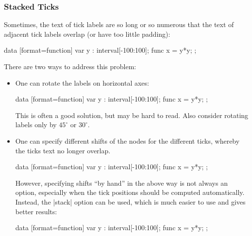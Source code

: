 \subsubsection{Stacked Ticks}
\label{section-dv-stacking}

Sometimes, the text of tick labels are so long or so numerous that the text of
adjacent tick labels overlap (or have too little padding):
%
\begin{codeexample}[]
\tikz \datavisualization [scientific axes,
                          all axes={length=2.5cm},
                          visualize as smooth line]
  data [format=function] {
    var y : interval[-100:100];
    func x = \value y*\value y;
  };
\end{codeexample}
%
There are two ways to address this problem:
%
\begin{itemize}
    \item One can rotate the labels on horizontal axes:
\begin{codeexample}[]
\tikz \datavisualization [scientific axes,
                          all axes={length=2.5cm},
                          x axis={ticks={node style={rotate=90, anchor=east}}},
                          visualize as smooth line]
  data [format=function] {
    var y : interval[-100:100];
    func x = \value y*\value y;
  };
\end{codeexample}
        This is often a good solution, but may be hard to read. Also consider
        rotating labels only by $45^\circ$ or $30^\circ$.
    \item One can specify different shifts of the nodes for the different
        ticks, whereby the ticks text no longer overlap.
\begin{codeexample}[]
\tikz \datavisualization [scientific axes,
                          all axes={length=2.5cm},
                          x axis={ticks={major at={0,4000,8000,
                                2000 as [node style={yshift=-1em}],
                                6000 as [node style={yshift=-1em}],
                                10000 as [node style={yshift=-1em}]}}},
                          visualize as smooth line]
  data [format=function] {
    var y : interval[-100:100];
    func x = \value y*\value y;
  };
\end{codeexample}
        However, specifying shifts ``by hand'' in the above way is not always
        an option, especially when the tick positions should be computed
        automatically. Instead, the |stack| option can be used, which is much
        easier to use and gives better results:
\begin{codeexample}[]
\tikz \datavisualization [scientific axes,
                          all axes={length=2.5cm}, x axis={ticks=stack},
                          visualize as smooth line]
  data [format=function] {
    var y : interval[-100:100];
    func x = \value y*\value y;
  };
\end{codeexample}
\end{itemize}

